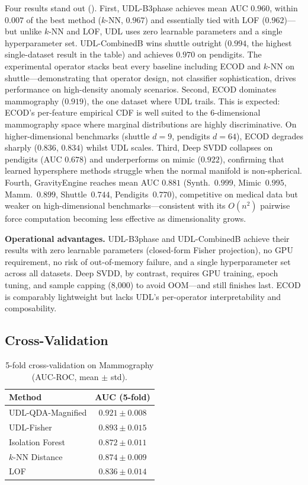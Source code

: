 \documentclass{article}
\begin{document}
Four results stand out (). First, UDL-B3phase achieves mean AUC $0.960$, within $0.007$ of the best method ($k$-NN, $0.967$) and essentially tied with LOF ($0.962$)---but unlike $k$-NN and LOF, UDL uses zero learnable parameters and a single hyperparameter set. UDL-CombinedB wins shuttle outright ($0.994$, the highest single-dataset result in the table) and achieves $0.970$ on pendigits. The experimental operator stacks beat every baseline including ECOD and $k$-NN on shuttle---demonstrating that operator design, not classifier sophistication, drives performance on high-density anomaly scenarios. Second, ECOD dominates mammography ($0.919$), the one dataset where UDL trails. This is expected: ECOD's per-feature empirical CDF is well suited to the 6-dimensional mammography space where marginal distributions are highly discriminative. On higher-dimensional benchmarks (shuttle $d{=}9$, pendigits $d{=}64$), ECOD degrades sharply ($0.836$, $0.834$) whilst UDL scales. Third, Deep SVDD collapses on pendigits (AUC $0.678$) and underperforms on mimic ($0.922$), confirming that learned hypersphere methods struggle when the normal manifold is non-spherical. Fourth, GravityEngine reaches mean AUC $0.881$ (Synth.~$0.999$, Mimic~$0.995$, Mamm.~$0.899$, Shuttle~$0.744$, Pendigits~$0.770$), competitive on medical data but weaker on high-dimensional benchmarks---consistent with its $O(n^2)$ pairwise force computation becoming less effective as dimensionality grows.

\textbf{Operational advantages.} UDL-B3phase and UDL-CombinedB achieve their results with zero learnable parameters (closed-form Fisher projection), no GPU requirement, no risk of out-of-memory failure, and a single hyperparameter set across all datasets. Deep SVDD, by contrast, requires GPU training, epoch tuning, and sample capping (8{,}000) to avoid OOM---and still finishes last. ECOD is comparably lightweight but lacks UDL's per-operator interpretability and composability.

\subsection{Cross-Validation}

\begin{table}[t]
\centering
\caption{5-fold cross-validation on Mammography (AUC-ROC, mean $\pm$ std).}
\label{tab:cv}
\begin{tabular}{@{}lc@{}}
\toprule
\textbf{Method} & \textbf{AUC (5-fold)} \\
\midrule
UDL-QDA-Magnified & $\mathbf{0.921 \pm 0.008}$ \\
UDL-Fisher & $0.893 \pm 0.015$ \\
Isolation Forest & $0.872 \pm 0.011$ \\
$k$-NN Distance & $0.874 \pm 0.009$ \\
LOF & $0.836 \pm 0.014$ \\
\bottomrule
\end{tabular}
\end{table}
\end{document}
